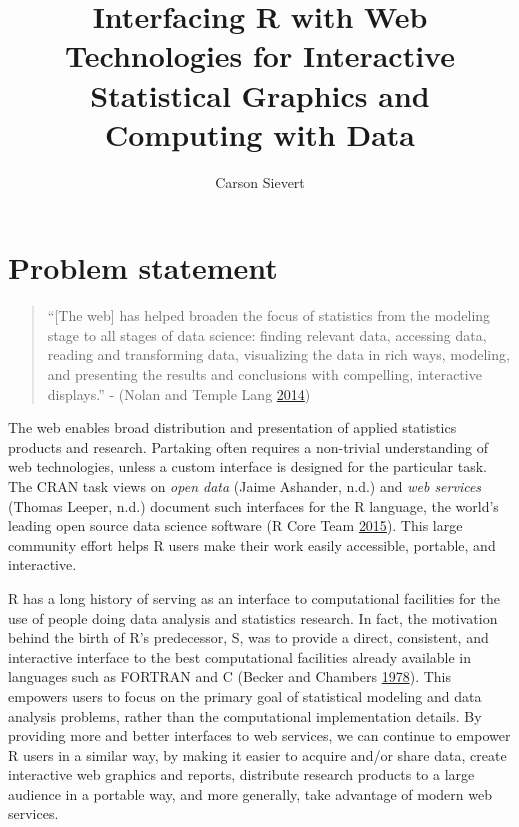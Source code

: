 \documentclass[12pt,]{isuthesis}
\title{Interfacing R with Web Technologies for Interactive Statistical Graphics
and Computing with Data}
\author{Carson Sievert}
\date{}
\begin{document}
\maketitle

{
\setcounter{tocdepth}{2}
\tableofcontents
}
\listoftables
\cleardoublepage {} {}
\listoffigures

\cleardoublepage {}

\newpage
{}
\chapter{Problem statement}

\begin{quote}
``{[}The web{]} has helped broaden the focus of statistics from the
modeling stage to all stages of data science: finding relevant data,
accessing data, reading and transforming data, visualizing the data in
rich ways, modeling, and presenting the results and conclusions with
compelling, interactive displays.'' - (Nolan and Temple Lang
\protect\hyperlink{ref-nolan-lang}{2014})
\end{quote}

The web enables broad distribution and presentation of applied
statistics products and research. Partaking often requires a non-trivial
understanding of web technologies, unless a custom interface is designed
for the particular task. The CRAN task views on \emph{open data} (Jaime
Ashander, n.d.) and \emph{web services} (Thomas Leeper, n.d.) document
such interfaces for the R language, the world's leading open source data
science software (R Core Team \protect\hyperlink{ref-RCore}{2015}). This
large community effort helps R users make their work easily accessible,
portable, and interactive.

R has a long history of serving as an interface to computational
facilities for the use of people doing data analysis and statistics
research. In fact, the motivation behind the birth of R's predecessor,
S, was to provide a direct, consistent, and interactive interface to the
best computational facilities already available in languages such as
FORTRAN and C (Becker and Chambers
\protect\hyperlink{ref-S:1978}{1978}). This empowers users to focus on
the primary goal of statistical modeling and data analysis problems,
rather than the computational implementation details. By providing more
and better interfaces to web services, we can continue to empower R
users in a similar way, by making it easier to acquire and/or share
data, create interactive web graphics and reports, distribute research
products to a large audience in a portable way, and more generally, take
advantage of modern web services.
\end{document}
